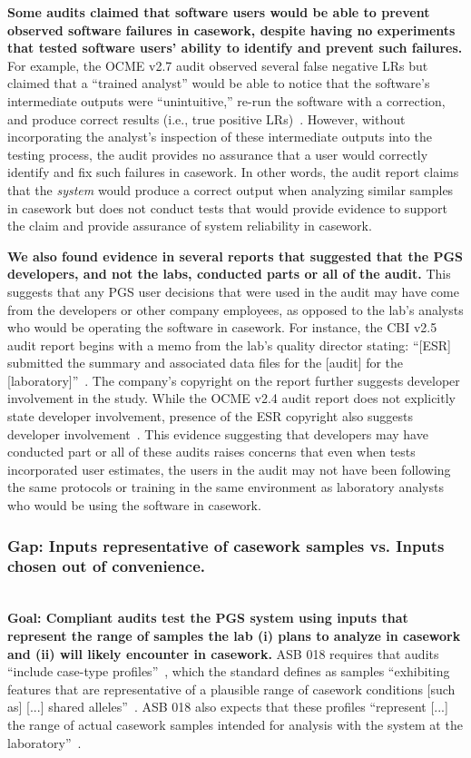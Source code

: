 \textbf{Some audits claimed that software users would be able to prevent observed software failures in casework, despite having no experiments that tested software users' ability to identify and prevent such failures.} For example, the OCME v2.7 audit observed several false negative LRs but claimed that a ``trained analyst'' would be able to notice that the software's intermediate outputs were ``unintuitive,'' re-run the software with a correction, and produce correct results (i.e., true positive LRs)~\cite[p.8]{ocmeIV2.7}. However, without incorporating the analyst's inspection of these intermediate outputs into the testing process, the audit provides no assurance that a user would correctly identify and fix such failures in casework. In other words, the audit report claims that the \textit{system} would produce a correct output when analyzing similar samples in casework but does not conduct tests that would provide evidence to support the claim and provide assurance of system reliability in casework.

\textbf{We also found evidence in several reports that suggested that the PGS developers, and not the labs, conducted parts or all of the audit.} This suggests that any PGS user decisions that were used in the audit may have come from the developers or other company employees, as opposed to the lab's analysts who would be operating the software in casework. For instance, the CBI v2.5 audit report begins with a memo from the lab's quality director stating: ``[ESR] submitted the summary and associated data files for the [audit] for the [laboratory]''~\cite[p.1]{cbiIV}. The company's copyright on the report further suggests developer involvement in the study. While the OCME v2.4 audit report does not explicitly state developer involvement, presence of the ESR copyright also suggests developer involvement~\cite{ocmeIV}. This evidence suggesting that developers may have conducted part or all of these audits raises concerns that even when tests incorporated user estimates, the users in the audit may not have been following the same protocols or training in the same environment as laboratory analysts who would be using the software in casework. 


\subsubsection{Gap: Inputs representative of casework samples vs. Inputs chosen out of convenience.}
\label{sec:scope-gap2-inputs}
\textbf{\\Goal: Compliant audits test the PGS system using inputs that represent the range of samples the lab (i) plans to analyze in casework and (ii) will likely encounter in casework.} ASB 018 requires that audits ``include case-type profiles''~\cite[R4.1.3]{asb018}, which the standard defines as samples ``exhibiting features that are representative of a plausible range of casework conditions [such as] [...] shared alleles''~\cite[p.1]{asb018}. ASB 018 also expects that these profiles ``represent [...] the range of actual casework samples intended for analysis with the system at the laboratory''~\cite[R4.1.3]{asb018}. 


